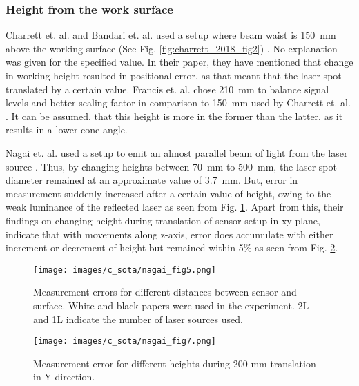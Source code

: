     
    \subsubsection*{Height from the work surface}
    Charrett et. al. and Bandari et. al. used a setup where beam waist is \SI{150}{\milli\meter} above the working surface (See Fig. \ref{fig:charrett_2018_fig2}) \cite{charrett_2018} \cite{bandari}. No explanation was given for the specified value. In their paper, they have mentioned that change in working height resulted in positional error, as that meant that the laser spot translated by a certain value. Francis et. al. chose \SI{210}{\milli\meter} \cite{francis_autonomous} to balance signal levels and better scaling factor in comparison to \SI{150}{\milli\meter} used by Charrett et. al. \cite{charrett_2018}. It can be assumed, that this height is more in the former than the latter, as it results in a lower cone angle.

    \vspace{5mm}

    \noindent Nagai et. al. used a setup to emit an almost parallel beam of light from the laser source \cite{nagai}. Thus, by changing heights between \SI{70}{\milli\meter} to \SI{500}{\milli\meter}, the laser spot diameter remained at an approximate value of \SI{3.7}{\milli\meter}. But, error in measurement suddenly increased after a certain value of height, owing to the weak luminance of the reflected laser as seen from Fig. \ref{fig:nagai_fig5}. Apart from this, their findings on changing height during translation of sensor setup in xy-plane, indicate that with movements along z-axis, error does accumulate with either increment or decrement of height but remained within 5\% as seen from Fig. \ref{fig:nagai_fig7}.

    \begin{figure}[h]
        \centering
        \texttt{[image: images/c\_sota/nagai\_fig5.png]}
        \caption{Measurement errors for different distances between sensor and surface. White and black papers were used in the experiment. 2L and 1L indicate the number of laser sources used. \cite{nagai}}
        \label{fig:nagai_fig5}
    \end{figure}

    \begin{figure}[h]
        \centering
        \texttt{[image: images/c\_sota/nagai\_fig7.png]}
        \caption{Measurement error for different heights during 200-mm translation in Y-direction. \cite{nagai}}
        \label{fig:nagai_fig7}
    \end{figure}

